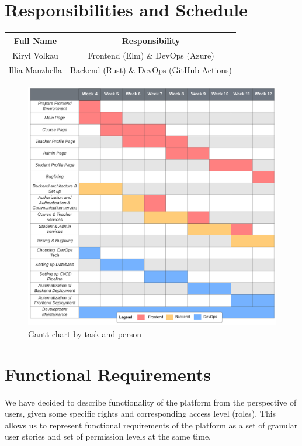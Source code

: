\documentclass[a4paper,11pt,twoside]{report}
\theoremstyle{definition}
\begin{document}
\chapter*{Responsibilities and Schedule}
\begin{center}
\begin{tabular}{ |c|c| } 
 \hline
 Full Name & Responsibility \\ 
 \hline
 Kiryl Volkau & Frontend (Elm) \& DevOps (Azure) \\ 
 Illia Manzhella & Backend (Rust) \& DevOps (GitHub Actions) \\ 
 \hline
\end{tabular}
\begin{figure}[h]
    \includegraphics[scale=.52]{img/gantt.png}
    \caption{Gantt chart by task and person}
\end{figure}
\end{center}

\chapter*{Functional Requirements}

We have decided to describe functionality of the platform from the perspective of users, given some specific rights and corresponding access level (roles). This allows us to represent functional requirements of the platform as a set of granular user stories and set of permission levels at the same time.
\end{document}

